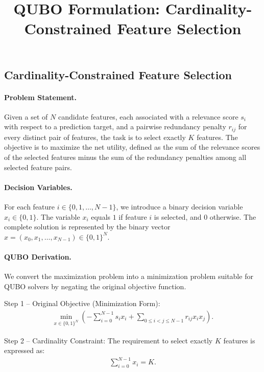 \documentclass[12pt]{article}
\title{QUBO Formulation: Cardinality-Constrained Feature Selection}
\date{}
\begin{document}
\maketitle

\subsection*{Cardinality-Constrained Feature Selection}

\paragraph{Problem Statement.}
Given a set of $N$ candidate features, each associated with a relevance score $s_i$ with respect to a prediction target, and a pairwise redundancy penalty $r_{ij}$ for every distinct pair of features, the task is to select exactly $K$ features. The objective is to maximize the net utility, defined as the sum of the relevance scores of the selected features minus the sum of the redundancy penalties among all selected feature pairs.

\paragraph{Decision Variables.}
For each feature $i \in \{0, 1, \dots, N-1\}$, we introduce a binary decision variable $x_i \in \{0,1\}$. The variable $x_i$ equals $1$ if feature $i$ is selected, and $0$ otherwise. The complete solution is represented by the binary vector $x = (x_0, x_1, \dots, x_{N-1}) \in \{0,1\}^N$.

\paragraph{QUBO Derivation.}
We convert the maximization problem into a minimization problem suitable for QUBO solvers by negating the original objective function.

Step 1 -- Original Objective (Minimization Form):
\begin{align}
    \min_{x \in \{0,1\}^N} \left( -\sum_{i=0}^{N-1} s_i x_i + \sum_{0 \le i < j \le N-1} r_{ij} x_i x_j \right).
\end{align}

Step 2 -- Cardinality Constraint:
The requirement to select exactly $K$ features is expressed as:
\begin{align}
    \sum_{i=0}^{N-1} x_i = K.
\end{align}
\end{document}
